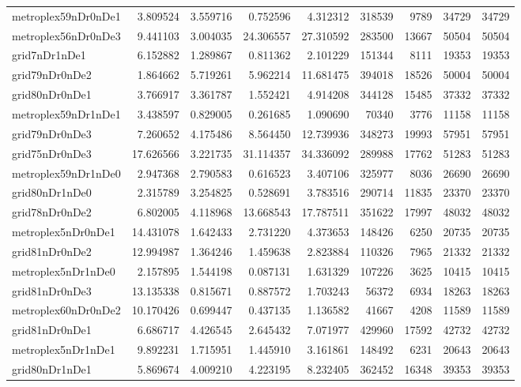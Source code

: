 \begin{longtable}{|l|r|r|r|r|r|r|r|r|}
metroplex59nDr0nDe1 & 3.809524 & 3.559716 & 0.752596 & 4.312312 & 318539 & 9789 & 34729 & 34729 \\
metroplex56nDr0nDe3 & 9.441103 & 3.004035 & 24.306557 & 27.310592 & 283500 & 13667 & 50504 & 50504 \\
grid7nDr1nDe1 & 6.152882 & 1.289867 & 0.811362 & 2.101229 & 151344 & 8111 & 19353 & 19353 \\
grid79nDr0nDe2 & 1.864662 & 5.719261 & 5.962214 & 11.681475 & 394018 & 18526 & 50004 & 50004 \\
grid80nDr0nDe1 & 3.766917 & 3.361787 & 1.552421 & 4.914208 & 344128 & 15485 & 37332 & 37332 \\
metroplex59nDr1nDe1 & 3.438597 & 0.829005 & 0.261685 & 1.090690 & 70340 & 3776 & 11158 & 11158 \\
grid79nDr0nDe3 & 7.260652 & 4.175486 & 8.564450 & 12.739936 & 348273 & 19993 & 57951 & 57951 \\
grid75nDr0nDe3 & 17.626566 & 3.221735 & 31.114357 & 34.336092 & 289988 & 17762 & 51283 & 51283 \\
metroplex59nDr1nDe0 & 2.947368 & 2.790583 & 0.616523 & 3.407106 & 325977 & 8036 & 26690 & 26690 \\
grid80nDr1nDe0 & 2.315789 & 3.254825 & 0.528691 & 3.783516 & 290714 & 11835 & 23370 & 23370 \\
grid78nDr0nDe2 & 6.802005 & 4.118968 & 13.668543 & 17.787511 & 351622 & 17997 & 48032 & 48032 \\
metroplex5nDr0nDe1 & 14.431078 & 1.642433 & 2.731220 & 4.373653 & 148426 & 6250 & 20735 & 20735 \\
grid81nDr0nDe2 & 12.994987 & 1.364246 & 1.459638 & 2.823884 & 110326 & 7965 & 21332 & 21332 \\
metroplex5nDr1nDe0 & 2.157895 & 1.544198 & 0.087131 & 1.631329 & 107226 & 3625 & 10415 & 10415 \\
grid81nDr0nDe3 & 13.135338 & 0.815671 & 0.887572 & 1.703243 & 56372 & 6934 & 18263 & 18263 \\
metroplex60nDr0nDe2 & 10.170426 & 0.699447 & 0.437135 & 1.136582 & 41667 & 4208 & 11589 & 11589 \\
grid81nDr0nDe1 & 6.686717 & 4.426545 & 2.645432 & 7.071977 & 429960 & 17592 & 42732 & 42732 \\
metroplex5nDr1nDe1 & 9.892231 & 1.715951 & 1.445910 & 3.161861 & 148492 & 6231 & 20643 & 20643 \\
grid80nDr1nDe1 & 5.869674 & 4.009210 & 4.223195 & 8.232405 & 362452 & 16348 & 39353 & 39353 \\

\end{longtable}
